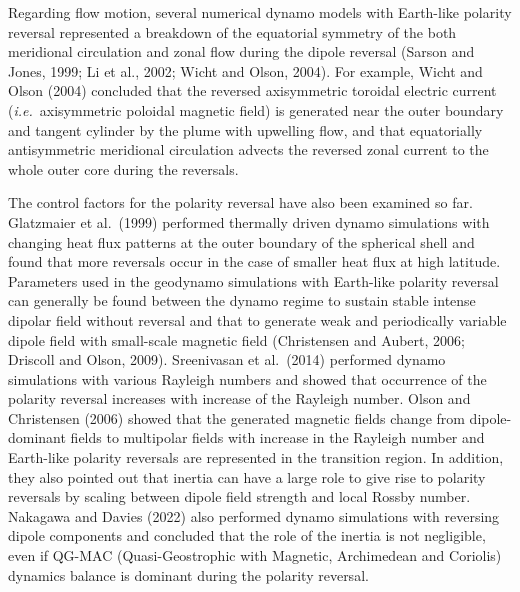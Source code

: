Regarding flow motion, several numerical dynamo models with Earth-like polarity reversal represented a breakdown of the equatorial symmetry of the both meridional circulation and zonal flow during the dipole reversal 
{\color{teal}
(Sarson and Jones, 1999;
}
Li et al., 2002; %
Wicht and Olson, 2004). %
{\color{teal}
For example,
} Wicht and Olson (2004) concluded that the reversed axisymmetric toroidal electric current ({\it i.e.}\ axisymmetric poloidal magnetic field) is generated near the outer boundary and tangent cylinder by the plume with upwelling flow, and that equatorially antisymmetric meridional circulation advects the reversed zonal current to the whole outer core during the reversals.

The control factors for the polarity reversal have also been examined so far.
Glatzmaier et al.\ (1999) %
performed thermally driven dynamo simulations with changing heat flux patterns at the outer boundary of the spherical shell and found that more reversals occur in the case of smaller heat flux at high latitude. 
Parameters used in the geodynamo simulations with Earth-like polarity reversal can generally be found between the dynamo regime to sustain stable intense dipolar field without reversal and that to generate weak and periodically variable dipole field with small-scale magnetic field (Christensen and Aubert, 2006; 
Driscoll and Olson, 2009). %
Sreenivasan et al.\ (2014) %
performed dynamo simulations with various Rayleigh numbers and showed that occurrence of the polarity reversal increases with increase of the Rayleigh number. 
{\color{magenta}
Olson and Christensen (2006) showed that the generated magnetic fields change from dipole-dominant fields to multipolar fields with increase in the Rayleigh number and Earth-like polarity reversals are represented in the transition region.
}
In addition, they also pointed out that inertia can have a large role to give rise to polarity reversals by scaling between dipole field strength and local Rossby number.
Nakagawa and Davies (2022) 
also performed dynamo simulations with reversing dipole components and concluded that the role of the inertia is not negligible, even if QG-MAC (Quasi-Geostrophic with Magnetic, Archimedean and Coriolis) dynamics balance is dominant during the polarity reversal.


